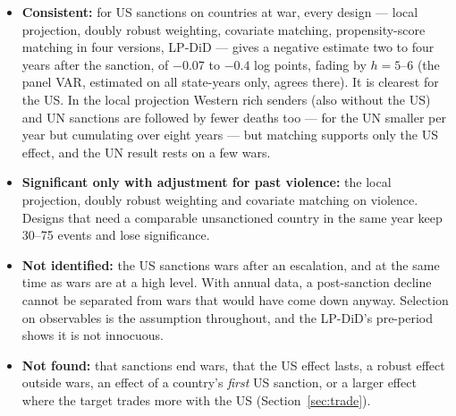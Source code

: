 \documentclass[11pt,a4paper]{article}
\begin{document}
\begin{itemize}[leftmargin=*]
\item \textbf{Consistent:} for US sanctions on countries at war, every design --- local projection, doubly robust
  weighting, covariate matching, propensity-score matching in four versions, LP-DiD --- gives a negative estimate two
  to four years after the sanction, of $-0.07$ to $-0.4$ log points, fading by $h=5$--6 (the panel VAR, estimated
  on all state-years only, agrees there).
  It is clearest for the US. In the local projection Western rich senders (also without the US) and UN sanctions
  are followed by fewer deaths too --- for the UN smaller per year but cumulating over eight years --- but matching
  supports only the US effect, and the UN result rests on a few wars.
\item \textbf{Significant only with adjustment for past violence:} the local projection, doubly robust weighting
  and covariate matching on violence. Designs that need a comparable unsanctioned country in the same year keep
  30--75 events and lose significance.
\item \textbf{Not identified:} the US sanctions wars after an escalation, and at the same time as wars are at a high
  level. With annual data, a post-sanction decline cannot be separated from wars that would have come down anyway.
  Selection on observables is the assumption throughout, and the LP-DiD's pre-period shows it is not innocuous.
\item \textbf{Not found:} that sanctions end wars, that the US effect lasts, a robust effect outside wars, an
  effect of a country's \emph{first} US sanction, or a larger effect where the target trades more with the US
  (Section~\ref{sec:trade}).
\end{itemize}



\end{document}
